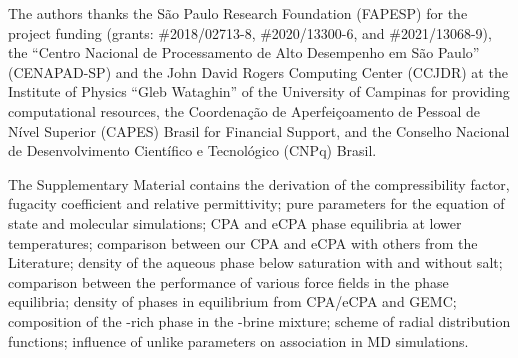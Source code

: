 \documentclass[journal=ascecg,manuscript=article]{achemso}
\begin{document}
\begin{acknowledgement}
The authors thanks the São Paulo Research Foundation (FAPESP) for the project funding (grants: \#2018/02713-8, \#2020/13300-6, and \#2021/13068-9), the ``Centro Nacional de Processamento de Alto Desempenho em São Paulo'' (CENAPAD-SP) and the John David Rogers Computing Center (CCJDR) at the Institute of Physics ``Gleb Wataghin'' of the University of Campinas for providing computational resources,
the Coordenação de Aperfeiçoamento de Pessoal de Nível Superior (CAPES) Brasil for Financial Support, and the Conselho Nacional de Desenvolvimento Científico e Tecnológico (CNPq) Brasil.
\end{acknowledgement}


\begin{suppinfo}
The Supplementary Material contains the derivation of the compressibility factor, fugacity coefficient and relative permittivity; pure parameters for the equation of state and molecular simulations;  CPA and eCPA phase equilibria at lower temperatures; comparison between our CPA and eCPA with others from the Literature; density of the aqueous phase below  saturation with and without salt; comparison between the performance of various force fields in the phase equilibria; density of phases in equilibrium from CPA/eCPA and GEMC; composition of the -rich phase in the -brine mixture; scheme of radial distribution functions; influence of  unlike parameters on association in MD simulations.
\end{suppinfo}

\newpage

\end{document}
